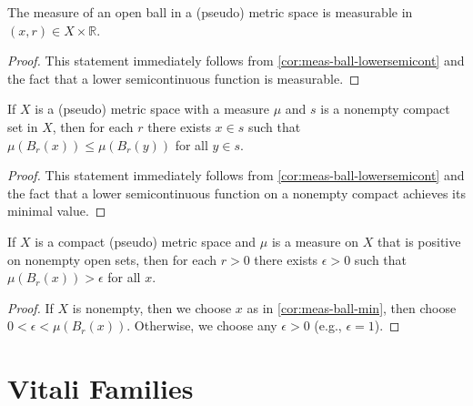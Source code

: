 \begin{corollary}%
  \label{cor:meas-ball-mesaurable}
  \leanok%
  The measure of an open ball in a (pseudo) metric space is measurable in \((x, r)\in X\times\mathbb R\).
\end{corollary}

\begin{proof}
  \leanok%
  This statement immediately follows from \autoref{cor:meas-ball-lowersemicont}
  and the fact that a lower semicontinuous function is measurable.
\end{proof}

\begin{corollary}%
  \label{cor:meas-ball-min}
  \leanok%
  If \(X\) is a (pseudo) metric space with a measure \(\mu\)
  and \(s\) is a nonempty compact set in \(X\),
  then for each \(r\) there exists \(x \in s\) such that \(\mu(B_{r}(x)) \le \mu(B_{r}(y))\) for all \(y \in s\).
\end{corollary}

\begin{proof}
  \leanok%
  This statement immediately follows from \autoref{cor:meas-ball-lowersemicont}
  and the fact that a lower semicontinuous function on a nonempty compact
  achieves its minimal value.
\end{proof}

\begin{corollary}%
  \label{cor:meas-ball-gt-pos}
  \leanok%
  If \(X\) is a compact (pseudo) metric space
  and \(\mu\) is a measure on \(X\) that is positive on nonempty open sets,
  then for each \(r > 0\) there exists \(\epsilon>0\)
  such that \(\mu(B_{r}(x))>\epsilon\) for all \(x\).
\end{corollary}

\begin{proof}
  \leanok%
  If \(X\) is nonempty, then we choose \(x\) as in \autoref{cor:meas-ball-min},
  then choose \(0 < \epsilon < \mu(B_{r}(x))\).
  Otherwise, we choose any \(\epsilon > 0\) (e.g., \(\epsilon = 1\)).
\end{proof}


\section{Vitali Families}%
\label{sec:vitali-families}

